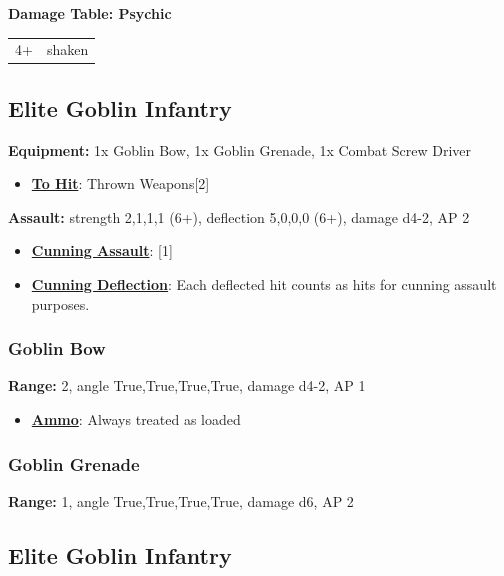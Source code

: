 \documentclass[a4paper,12pt]{article}
\begin{document}
\noindent\textbf{Damage Table: Psychic}

\begin{tabular}{ll}
4+ & shaken \\
\end{tabular}
\vspace{1ex}

\subsection{Elite Goblin Infantry}

\textbf{Equipment:} 1x Goblin Bow, 1x Goblin Grenade, 1x Combat Screw Driver \\

\begin{itemize}
\item \textbf{\hyperref[rule-special-to-hit]{To Hit}}: Thrown Weapons[2]
\end{itemize}
\textbf{Assault:} strength 2,1,1,1 (6+),
deflection 5,0,0,0 (6+),
damage d4-2, AP 2

\begin{itemize}
\item \textbf{\hyperref[rule-special-cunning-assault]{Cunning Assault}}: [1]
\item \textbf{\hyperref[rule-special-cunning-deflection]{Cunning Deflection}}: Each deflected hit counts as hits for cunning assault purposes.
\end{itemize}

\subsubsection{Goblin Bow}

\textbf{Range:} 2, angle True,True,True,True, damage d4-2, AP 1

\begin{itemize}
\item \textbf{\hyperref[rule-special-ammo]{Ammo}}: Always treated as loaded
\end{itemize}
\subsubsection{Goblin Grenade}

\textbf{Range:} 1, angle True,True,True,True, damage d6, AP 2

\subsection{Elite Goblin Infantry}
\end{document}
